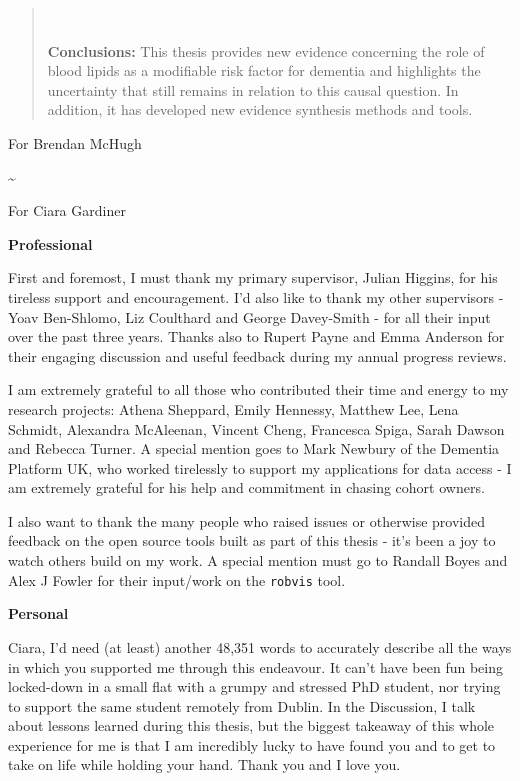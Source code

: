 \documentclass[a4paper, twoside]{templates/ociamthesis}
\begin{document}
\begin{romanpages}
\begin{abstract}
 ~

 \textbf{Conclusions:}
 This thesis provides new evidence concerning the role of blood lipids as a modifiable risk factor for dementia and highlights the uncertainty that still remains in relation to this causal question. In addition, it has developed new evidence synthesis methods and tools.
\end{abstract}

\begin{dedication}
  For Brendan McHugh

  \textasciitilde{}

  For Ciara Gardiner
\end{dedication}

\begin{acknowledgements}
 	\textbf{Professional}

  First and foremost, I must thank my primary supervisor, Julian Higgins, for his tireless support and encouragement. I'd also like to thank my other supervisors - Yoav Ben-Shlomo, Liz Coulthard and George Davey-Smith - for all their input over the past three years. Thanks also to Rupert Payne and Emma Anderson for their engaging discussion and useful feedback during my annual progress reviews.

  I am extremely grateful to all those who contributed their time and energy to my research projects: Athena Sheppard, Emily Hennessy, Matthew Lee, Lena Schmidt, Alexandra McAleenan, Vincent Cheng, Francesca Spiga, Sarah Dawson and Rebecca Turner. A special mention goes to Mark Newbury of the Dementia Platform UK, who worked tirelessly to support my applications for data access - I am extremely grateful for his help and commitment in chasing cohort owners.

  I also want to thank the many people who raised issues or otherwise provided feedback on the open source tools built as part of this thesis - it's been a joy to watch others build on my work. A special mention must go to Randall Boyes and Alex J Fowler for their input/work on the \texttt{robvis} tool.

  \bigskip

  \textbf{Personal}

  Ciara, I'd need (at least) another 48,351 words to accurately describe all the ways in which you supported me through this endeavour. It can't have been fun being locked-down in a small flat with a grumpy and stressed PhD student, nor trying to support the same student remotely from Dublin. In the Discussion, I talk about lessons learned during this thesis, but the biggest takeaway of this whole experience for me is that I am incredibly lucky to have found you and to get to take on life while holding your hand. Thank you and I love you.


\end{acknowledgements}
\end{romanpages}
\end{document}

